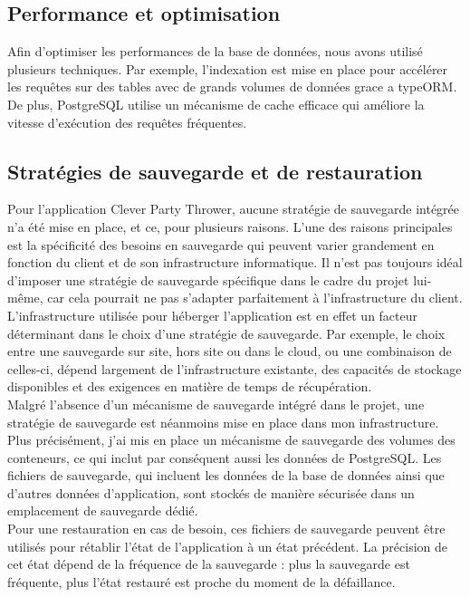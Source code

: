 \subsection{Performance et optimisation}\label{subsec:performance-optimization}
Afin d'optimiser les performances de la base de données, nous avons utilisé plusieurs techniques.
Par exemple, l'indexation est mise en place pour accélérer les requêtes sur des tables avec de grands volumes de données grace a typeORM\@.
De plus, PostgreSQL utilise un mécanisme de cache efficace qui améliore la vitesse d'exécution des requêtes fréquentes.\\

\subsection{Stratégies de sauvegarde et de restauration}\label{subsec:backup-restore}
Pour l'application Clever Party Thrower, aucune stratégie de sauvegarde intégrée n'a été mise en place, et ce, pour plusieurs raisons.
L'une des raisons principales est la spécificité des besoins en sauvegarde qui peuvent varier grandement en fonction du client et de son infrastructure informatique.
Il n'est pas toujours idéal d'imposer une stratégie de sauvegarde spécifique dans le cadre du projet lui-même, car cela pourrait ne pas s'adapter parfaitement à l'infrastructure du client.\\

L'infrastructure utilisée pour héberger l'application est en effet un facteur déterminant dans le choix d'une stratégie de sauvegarde.
Par exemple, le choix entre une sauvegarde sur site, hors site ou dans le cloud, ou une combinaison de celles-ci, dépend largement de l'infrastructure existante,
des capacités de stockage disponibles et des exigences en matière de temps de récupération.\\

Malgré l'absence d'un mécanisme de sauvegarde intégré dans le projet, une stratégie de sauvegarde est néanmoins mise en place dans mon infrastructure.
Plus précisément, j'ai mis en place un mécanisme de sauvegarde des volumes des conteneurs, ce qui inclut par conséquent aussi les données de PostgreSQL.
Les fichiers de sauvegarde, qui incluent les données de la base de données ainsi que d'autres données d'application, sont stockés de manière sécurisée dans un emplacement de sauvegarde dédié.\\

Pour une restauration en cas de besoin, ces fichiers de sauvegarde peuvent être utilisés pour rétablir l'état de l'application à un état précédent.
La précision de cet état dépend de la fréquence de la sauvegarde : plus la sauvegarde est fréquente, plus l'état restauré est proche du moment de la défaillance.\\

